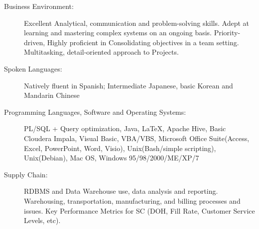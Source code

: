 \documentclass[letterpaper,11pt]{article}
\begin{document}
\begin{description}

	\item[Business Environment:]
		Excellent Analytical, communication and problem-solving skills. Adept at learning and mastering complex systems on an ongoing basis. Priority-driven, Highly proficient in Consolidating objectives in a team setting. Multitasking, detail-oriented approach to Projects.
		
	\item[Spoken Languages:]
		Natively fluent in Spanish;  Intermediate Japanese, basic Korean and Mandarin Chinese

	\item[Programming Languages, Software and Operating Systems:]
		PL/SQL + Query optimization, Java, \LaTeX, Apache Hive, Basic Cloudera Impala, Visual Basic, VBA/VBS,  Microsoft Office Suite(Access, Excel, PowerPoint, Word, Visio), Unix(Bash/simple scripting), Unix(Debian), Mac OS, Windows 95/98/2000/ME/XP/7

	\item[Supply Chain:]
		RDBMS and Data Warehouse use, data analysis and reporting. Warehousing, transportation, manufacturing, and billing processes and issues. Key Performance Metrics for SC (DOH, Fill Rate, Customer Service Levels, etc).

\end{description}
\end{document}
